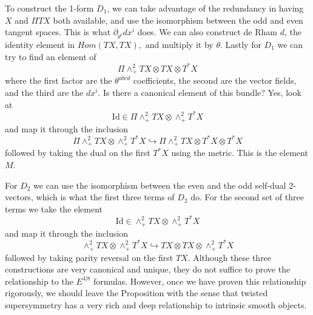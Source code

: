 \documentclass[twoside]{amsart}
\newcommand{\enm}[1]{\ensuremath{#1}}
\newcommand{\superijk}[3]{\enm{{#1}^{#2|#3}}}
\newcommand{\rrij}[2]{\superijk{E}{#1}{#2}}
\begin{document}
To construct the 1-form \( D_{1} \), we can take advantage of the
redundancy in having \( X \) and \( \Pi TX \) both available, and use
the isomorphism between the odd and even tangent spaces.  This is what
\( \partial_{\theta^{i}}dx^{i} \) does.  We can also construct de Rham
\( d \), the identity element in \( Hom(TX, TX), \) and multiply it by
\( \theta \).  Lastly for \( D_{1} \) we can try to find an element of
\[ \Pi\wedge^{2}_{+}TX \otimes TX\otimes T^{*}X \]
where the first factor are the \( \theta^{abcd} \) coefficients, the
second are the vector fields, and the third are the \( dx^{i} \).  Is
there a canonical element of this bundle?  Yes, look at
\[ \mathrm{Id}\in\Pi \wedge^{2}_{+}TX\otimes\wedge^{2}_{+}T^{*}X \]
and map it through the inclusion
\[ \Pi \wedge^{2}_{+}TX\otimes\wedge^{2}_{+}T^{*}X \hookrightarrow
\Pi\wedge^{2}_{+}TX\otimes T^{*}X\otimes T^{*}X \]
followed by taking the dual on the first \( T^{*}X \) using the
metric.  This is the element \( M \).

For \( D_{2} \) we can use the isomorphism between the even and the
odd self-dual 2-vectors, which is what the first three terms of \(
D_{2} \) do.  For the second set of three terms we take the element \[
\mathrm{Id}\in\wedge^{2}_{+}TX\otimes\wedge^{2}_{+}T^{*}X \] and map
it through the inclusion \[
\wedge^{2}_{+}TX\otimes\wedge^{2}_{+}T^{*}X\hookrightarrow TX\otimes
TX\otimes\wedge^{2}_{+}T^{*}X \] followed by taking parity reversal on
the first \( TX \).  Although these three constructions are very
canonical and unique, they do not suffice to prove the relationship to
the \rrij{4}{8} formulas.  However, once we have proven this
relationship rigorously, we should leave the Proposition with the
sense that twisted supersymmetry has a very rich and deep relationship
to intrinsic smooth objects.
\end{document}
